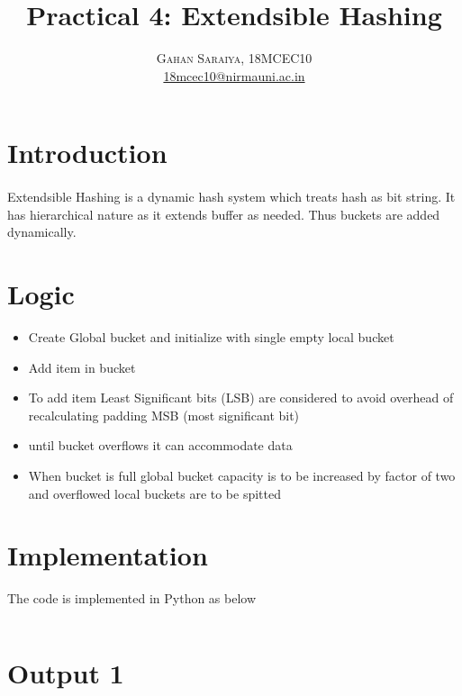 \documentclass[paper=letter, fontsize=12pt]{article}
\title{\vspace{-15mm}\fontsize{24pt}{10pt}\selectfont\textbf{Practical 4: Extendsible Hashing}} %
\author{
\large
{\textsc{Gahan Saraiya, 18MCEC10 }}\\[2mm]
\normalsize \href{mailto:18mcec10@nirmauni.ac.in}{18mcec10@nirmauni.ac.in}\\[2mm] %
}
\date{}
\begin{document}
\maketitle %
\thispagestyle{fancy} %

\newcommand*\tick{\item[\Checkmark]}
\newcommand*\arrow{\item[$\Rightarrow$]}
\newcommand*\fail{\item[\XSolidBrush]}

\section{Introduction}
\paragraph{}
Extendsible Hashing is a dynamic hash system which treats hash as bit string. It has hierarchical nature as it extends buffer as needed. Thus buckets are added dynamically.

\section{Logic}
\begin{itemize}
	\item Create Global bucket and initialize with single empty local bucket
	\item Add item in bucket
	\item To add item Least Significant bits (LSB) are considered to avoid overhead of recalculating padding MSB (most significant bit)
	\item until bucket overflows it can accommodate data
	\item When bucket is full global bucket capacity is to be increased by factor of two and overflowed local buckets are to be spitted
\end{itemize}

\section{Implementation}
The code is implemented in Python as below

\inputminted[frame=lines, breaklines, linenos]{python}{extendsibleHashing.py}

\section*{Output 1}
\inputminted[frame=lines, breaklines]{text}{output1.txt}
\end{document}
